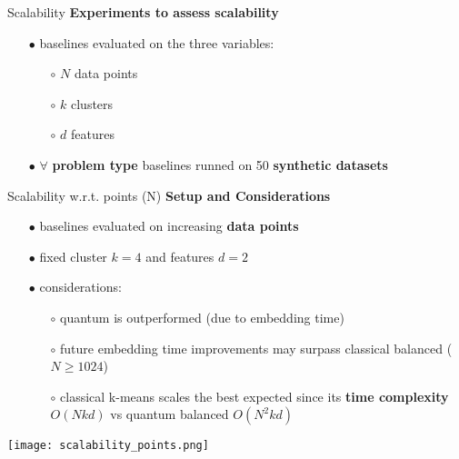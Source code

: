 		\begin{frame}{Scalability}
			\textbf{Experiments to assess scalability}
			\begin{itemize}
				\item[$\bullet$] baselines evaluated on the three variables:
				\begin{itemize}
					\item[$\circ$] $N$ data points  					
					\item[$\circ$] $k$ clusters
					\item[$\circ$] $d$ features 
				\end{itemize}
				\item[$\bullet$] $\forall$ \textbf{problem type} baselines runned on 50 \textbf{synthetic datasets}
			\end{itemize}

		\end{frame}

		\begin{frame}[allowframebreaks]{Scalability w.r.t. points (N)}
			\textbf{Setup and Considerations}
			\begin{itemize}
				\item[$\bullet$] baselines evaluated on increasing \textbf{data points}
				\item[$\bullet$] fixed cluster $k=4$ and features $d=2$
				\item[$\bullet$] considerations:
				\begin{itemize}
					\item[$\circ$] quantum is outperformed (due to embedding time)
					\item[$\circ$] future embedding time improvements may surpass classical balanced ($N \geq 1024$)
					\item[$\circ$] classical k-means scales the best expected since its \textbf{time complexity} $O(Nkd)$ vs quantum balanced $O(N^2kd)$ 
				\end{itemize} 
			\end{itemize}
			\begin{center}
				\texttt{[image: scalability\_points.png]}
			\end{center}	
			
		\end{frame}

